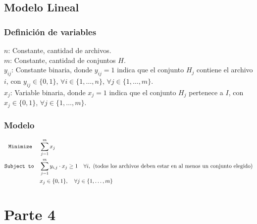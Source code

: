 \documentclass[11pt, a4paper, pdftex]{article}
\begin{document}
\subsection{Modelo Lineal}

\subsubsection{Definición de variables}

\noindent $n$: Constante, cantidad de archivos. \\

\noindent $m$: Constante, cantidad de conjuntos $H$. \\

\noindent $y_{ij}$: Constante binaria, donde $y_{ij} = 1$ indica que el conjunto $H_{j}$ contiene el archivo $i$, con $y_{ij} \in \{0, 1\}$, $\forall i \in \{1, \ldots, n\}$, $\forall j \in \{1, \ldots, m\}$. \\

\noindent $x_{j}$: Variable binaria, donde $x_{j} = 1$ indica que el conjunto $H_{j}$ pertenece a $I$, con $x_{j} \in \{0, 1\}$, $\forall j \in \{1, \ldots, m\}$. \\


\subsubsection{Modelo}

\begin{alignat*}{2}
    \texttt{Minimize}\quad\,\, & \sum_{j = 1}^{m} x_{j}\\
    \texttt{Subject to}\quad   & \sum_{j=1}^{m} y_{i,j} \cdot x_j \geq 1 \quad \forall i,\ \text{(todos los archivos deben estar en al menos un conjunto elegido)}\\
              & x_{j} \in \{0,1\}, \quad \forall j \in \{1, \ldots, m\} \\
\end{alignat*}

\newpage
\section{Parte 4}\label{cuarta:parte}
\end{document}
